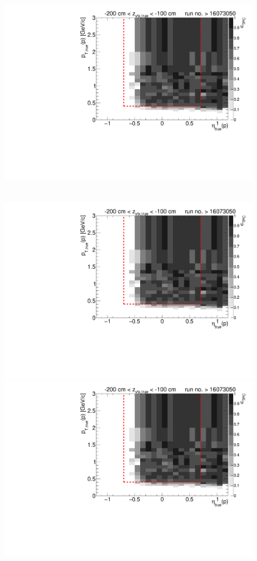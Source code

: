 \begin{figure}[hb]
{		\includegraphics[width=\linewidth,page=17]{graphics/eff/Eff2D_TPC_proton_Plus_RunRange2.pdf}
	}~
	\parbox{0.495\textwidth}{
		\centering
		\includegraphics[width=\linewidth,page=12]{graphics/eff/Eff2D_TPC_proton_Plus_RunRange2.pdf}\\
		\includegraphics[width=\linewidth,page=14]{graphics/eff/Eff2D_TPC_proton_Plus_RunRange2.pdf}\\
}
\end{figure}
